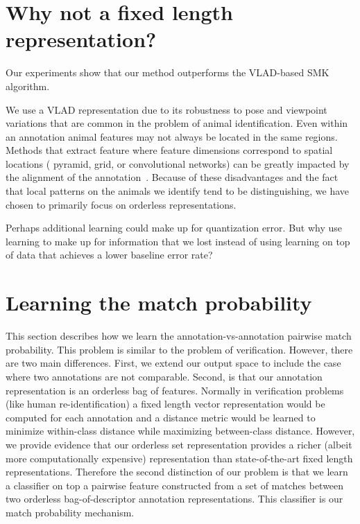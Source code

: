 
\section{Why not a fixed length representation?}

Our experiments show that our method outperforms the VLAD-based SMK algorithm.

We use a VLAD representation due to its robustness to pose and viewpoint
  variations that are common in the problem of animal identification.
Even within an annotation animal features may not always be located in the
  same regions.
Methods that extract feature where feature dimensions correspond to spatial
  locations (\ie{} pyramid, grid, or convolutional networks) can be greatly
  impacted by the alignment of the annotation~\cite{wu_viewpoint_2015}.
Because of these disadvantages and the fact that local patterns on the animals
  we identify tend to be distinguishing, we have chosen to primarily focus on
  orderless representations.


Perhaps additional learning could make up for quantization error.
But why use learning to make up for information that we lost instead of using
  learning on top of data that achieves a lower baseline error rate?

\section{Learning the match probability}

This section describes how we learn the annotation-vs-annotation pairwise
  match probability.
This problem is similar to the problem of verification.
However, there are two main differences.
First, we extend our output space to include the case where two annotations
  are not comparable.
Second, is that our annotation representation is an orderless bag of features.
Normally in verification problems (like human re-identification) a fixed
  length vector representation would be computed for each annotation and a
  distance metric would be learned to minimize within-class distance while
  maximizing between-class distance.
However, we provide evidence that our orderless set representation provides a
  richer (albeit more computationally expensive) representation than
  state-of-the-art fixed length representations.
Therefore the second distinction of our problem is that we learn a classifier
  on top a pairwise feature constructed from a set of matches between two
  orderless bag-of-descriptor annotation representations.
This classifier is our match probability mechanism.

